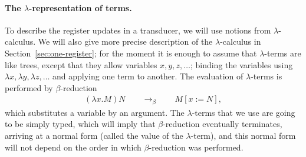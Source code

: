 \paragraph*{The $\lambda$-representation of terms.} 
To describe the register updates in a transducer, we will use notions from $\lambda$-calculus.  
We will also give more precise description of the $\lambda$-calculus in Section~\ref{sec:one-register}; for the moment it is enough to assume that $\lambda$-terms are like trees, except that they allow variables $x,y,z,\ldots$; binding the variables using $\lambda x, \lambda y, \lambda z, \ldots$ and applying one term to another. The evaluation of $\lambda$-terms is performed by $\beta$-reduction
\begin{align*}
(\lambda x. M) N \qquad \to_\beta \qquad M[x:=N],
\end{align*}
which substitutes a variable by an argument. The $\lambda$-terms that we use are going to be simply typed, which will imply that $\beta$-reduction eventually terminates, arriving at a normal form (called the value of the $\lambda$-term), and this normal form will not depend on the order in which $\beta$-reduction was performed. 

